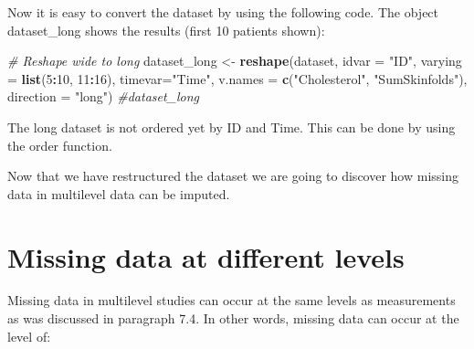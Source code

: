 \documentclass[
]{book}
\newenvironment{Shaded}{\begin{snugshade}}{\end{snugshade}}
\newcommand{\CommentTok}[1]{\textcolor[rgb]{0.56,0.35,0.01}{\textit{#1}}}
\newcommand{\DataTypeTok}[1]{\textcolor[rgb]{0.13,0.29,0.53}{#1}}
\newcommand{\DecValTok}[1]{\textcolor[rgb]{0.00,0.00,0.81}{#1}}
\newcommand{\KeywordTok}[1]{\textcolor[rgb]{0.13,0.29,0.53}{\textbf{#1}}}
\newcommand{\NormalTok}[1]{#1}
\newcommand{\OperatorTok}[1]{\textcolor[rgb]{0.81,0.36,0.00}{\textbf{#1}}}
\newcommand{\StringTok}[1]{\textcolor[rgb]{0.31,0.60,0.02}{#1}}
\begin{document}
Now it is easy to convert the dataset by using the following code. The object dataset\_long shows the results (first 10 patients shown):

\begin{Shaded}
\begin{Highlighting}[]
\CommentTok{# Reshape wide to long}
\NormalTok{dataset_long <-}\StringTok{ }\KeywordTok{reshape}\NormalTok{(dataset, }\DataTypeTok{idvar =} \StringTok{"ID"}\NormalTok{, }\DataTypeTok{varying =} \KeywordTok{list}\NormalTok{(}\DecValTok{5}\OperatorTok{:}\DecValTok{10}\NormalTok{, }\DecValTok{11}\OperatorTok{:}\DecValTok{16}\NormalTok{), }\DataTypeTok{timevar=}\StringTok{"Time"}\NormalTok{, }
         \DataTypeTok{v.names =} \KeywordTok{c}\NormalTok{(}\StringTok{"Cholesterol"}\NormalTok{, }\StringTok{"SumSkinfolds"}\NormalTok{), }\DataTypeTok{direction =} \StringTok{"long"}\NormalTok{)}
\CommentTok{#dataset_long}
\end{Highlighting}
\end{Shaded}

The long dataset is not ordered yet by ID and Time. This can be done by using the order function.

\begin{Shaded}
\end{Shaded}

Now that we have restructured the dataset we are going to discover how missing data in multilevel data can be imputed.

\hypertarget{missing-data-at-different-levels}{%
\section{Missing data at different levels}\label{missing-data-at-different-levels}}

Missing data in multilevel studies can occur at the same levels as measurements as was discussed in paragraph 7.4. In other words, missing data can occur at the level of:
\end{document}
